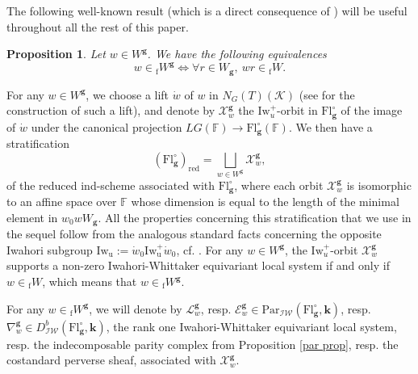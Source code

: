 \documentclass[11pt]{amsart}
\theoremstyle{plain}
\newtheorem{prop}[thm]{Proposition}
\theoremstyle{remark}
\numberwithin{equation}{section}
\begin{document}
	The following well-known result (which is a direct consequence of \cite[Lemma 2.2]{achar2021geometric}) will be useful throughout all the rest of this paper.
	\begin{prop}\label{prop min coset}
		Let $w\in {W}^\mathbf{g}$. We have the following equivalences
		$$w\in {_{\mathrm{f}}W}^\mathbf{g}\Longleftrightarrow \forall r\in W_\mathbf{g},~wr\in {_{\mathrm{f}}W}.$$
	\end{prop}
	For any $w\in W^\mathbf{g}$, we choose a lift $\dot{w}$ of $w$ in $N_G(T)(\mathcal{K})$ (see \cite[§4.2]{riche2020smithtreumann} for the construction of such a lift), and denote by $\mathscr{X}^\mathbf{g}_{w}$ the $\mathrm{Iw}_{u}^+$-orbit in $\mathrm{Fl}^{\circ}_{\mathbf{g}}$ of the image of $\dot{w}$ under the canonical projection $LG(\mathbb{F})\to \mathrm{Fl}^{\circ}_{\mathbf{g}}(\mathbb{F})$. We then have a stratification
	\begin{equation}\label{startification bruhat}
	    (\mathrm{Fl}^{\circ}_{\mathbf{g}})_\mathrm{red}=\bigsqcup_{w\in {W}^\mathbf{g}} \mathscr{X}^\mathbf{g}_{w},
	\end{equation}
	 of the reduced ind-scheme associated with $\mathrm{Fl}^{\circ}_{\mathbf{g}}$, where each orbit $\mathscr{X}^\mathbf{g}_{w}$ is isomorphic to an affine space over $\mathbb{F}$ whose dimension is equal to the length of the minimal element in $w_0wW_\mathbf{g}$. All the properties concerning this stratification that we use in the sequel follow from the analogous standard facts concerning the opposite Iwahori subgroup $\mathrm{Iw}_{\mathrm{u}}:=\dot{w}_0\mathrm{Iw}^+_{\mathrm{u}}\dot{w}_0$, cf. \cite[§A.A]{epiga:4984}. For any $w\in W^\mathbf{g}$, the $\mathrm{Iw}_{u}^+$-orbit $\mathscr{X}^\mathbf{g}_{w}$ supports a non-zero Iwahori-Whittaker equivariant local system if and only if $w\in {_\mathrm{f}W}$, which means that $w\in {_\mathrm{f}W}^\mathbf{g}$.
	
	For any $w\in{_\mathrm{f}W}^\mathbf{g}$, we will denote by $\mathcal{L}^\mathbf{g}_{w}$, resp.  $\mathcal{E}^{\mathbf{g}}_w\in \mathrm{Par}_{\mathcal{IW}}(\mathrm{Fl}^{\circ}_{\mathbf{g}},\mathbf{k})$, resp. $\nabla^{\mathbf{g}}_w\in D^b_{\mathcal{IW}}(\mathrm{Fl}^{\circ}_{\mathbf{g}},\mathbf{k})$, the rank one Iwahori-Whittaker equivariant local system, resp. the indecomposable parity complex from Proposition \ref{par prop}, resp. the costandard perverse sheaf,  associated with $\mathscr{X}^\mathbf{g}_{w}$. 
	
\end{document}
